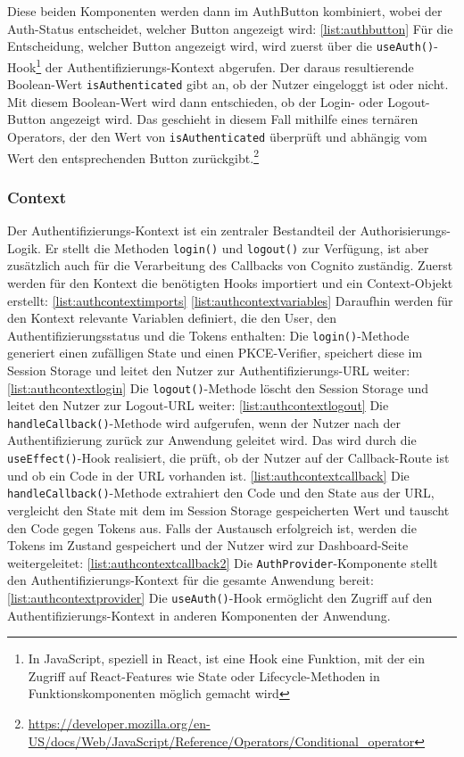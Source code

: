 Diese beiden Komponenten werden dann im AuthButton kombiniert, wobei der Auth-Status entscheidet, 
welcher Button angezeigt wird: \ref{list:authbutton}
Für die Entscheidung, welcher Button angezeigt wird, wird zuerst über die \texttt{useAuth()}-Hook\footnote{In JavaScript, speziell in React, ist eine Hook eine Funktion, mit der ein Zugriff auf React-Features wie State oder Lifecycle-Methoden in Funktionskomponenten möglich gemacht wird}
der Authentifizierungs-Kontext abgerufen. Der daraus resultierende Boolean-Wert \texttt{isAuthenticated} gibt an, ob der Nutzer eingeloggt ist oder nicht.
Mit diesem Boolean-Wert wird dann entschieden, ob der Login- oder Logout-Button angezeigt wird. Das geschieht in diesem Fall mithilfe eines ternären Operators,
der den Wert von \texttt{isAuthenticated} überprüft und abhängig vom Wert den entsprechenden Button zurückgibt.\footnote{\url{https://developer.mozilla.org/en-US/docs/Web/JavaScript/Reference/Operators/Conditional_operator}}
\subsubsection{Context}
Der Authentifizierungs-Kontext ist ein zentraler Bestandteil der Authorisierungs-Logik. Er stellt die Methoden \texttt{login()} und \texttt{logout()} 
zur Verfügung, ist aber zusätzlich auch für die Verarbeitung des Callbacks von Cognito zuständig.
Zuerst werden für den Kontext die benötigten Hooks importiert und ein Context-Objekt erstellt: \ref{list:authcontextimports} \ref{list:authcontextvariables}
Daraufhin werden für den Kontext relevante Variablen definiert, die den User, den Authentifizierungsstatus und die Tokens enthalten:
Die \texttt{login()}-Methode generiert einen zufälligen State und einen PKCE-Verifier, speichert diese im Session Storage und 
leitet den Nutzer zur Authentifizierungs-URL weiter: \ref{list:authcontextlogin}
Die \texttt{logout()}-Methode löscht den Session Storage und leitet den Nutzer zur Logout-URL weiter: \ref{list:authcontextlogout}
Die \texttt{handleCallback()}-Methode wird aufgerufen, wenn der Nutzer nach der Authentifizierung zurück zur Anwendung geleitet wird.
Das wird durch die \texttt{useEffect()}-Hook realisiert, die prüft, ob der Nutzer auf der Callback-Route ist und ob ein Code in der URL vorhanden ist. \ref{list:authcontextcallback}
Die \texttt{handleCallback()}-Methode extrahiert den Code und den State aus der URL, vergleicht den State mit dem im Session Storage gespeicherten Wert und tauscht den Code gegen Tokens aus.
Falls der Austausch erfolgreich ist, werden die Tokens im Zustand gespeichert und der Nutzer wird zur Dashboard-Seite weitergeleitet: \ref{list:authcontextcallback2}
Die \texttt{AuthProvider}-Komponente stellt den Authentifizierungs-Kontext für die gesamte Anwendung bereit: \ref{list:authcontextprovider}
Die \texttt{useAuth()}-Hook ermöglicht den Zugriff auf den Authentifizierungs-Kontext in anderen Komponenten der Anwendung.
